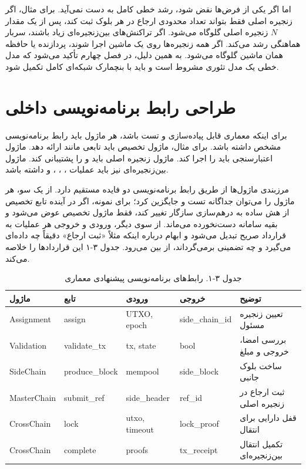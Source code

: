 اما اگر یکی از فرض‌ها نقض شود، رشد خطی کامل به دست نمی‌آید. برای مثال، اگر زنجیره اصلی فقط بتواند تعداد محدودی ارجاع در هر بلوک ثبت کند، پس از یک مقدار \(N\) زنجیره اصلی گلوگاه می‌شود. اگر تراکنش‌های بین‌زنجیره‌ای زیاد باشند، سربار هماهنگی رشد می‌کند. اگر همه زنجیره‌ها روی یک ماشین اجرا شوند، پردازنده یا حافظه همان ماشین گلوگاه می‌شود. به همین دلیل، در فصل چهارم تأکید می‌شود که مدل خطی یک مدل تئوری مشروط است و باید با بنچمارک شبکه‌ای کامل تکمیل شود.

\section{طراحی رابط برنامه‌نویسی داخلی}

برای اینکه معماری قابل پیاده‌سازی و تست باشد، هر ماژول باید رابط برنامه‌نویسی مشخص داشته باشد. برای مثال، ماژول تخصیص باید تابعی مانند  ارائه دهد. ماژول اعتبارسنجی باید  را اجرا کند. ماژول زنجیره اصلی باید  و  را پشتیبانی کند. ماژول بین‌زنجیره‌ای نیز باید عملیات ، ، ،  و  داشته باشد.

مرزبندی ماژول‌ها از طریق رابط برنامه‌نویسی دو فایده مستقیم دارد. از یک سو، هر ماژول را می‌توان جداگانه تست و جایگزین کرد؛ برای نمونه، اگر در آینده تابع تخصیص از هش ساده به درهم‌سازی سازگار تغییر کند، فقط ماژول تخصیص عوض می‌شود و بقیه سامانه دست‌نخورده می‌ماند. از سوی دیگر، ورودی و خروجی هر عملیات به قرارداد صریح تبدیل می‌شود و ابهام درباره اینکه مثلاً «ثبت ارجاع» دقیقاً چه داده‌ای می‌گیرد و چه تضمینی برمی‌گرداند، از بین می‌رود. جدول ۳-۱ این قراردادها را خلاصه می‌کند.

\begin{table}[h]
\centering
\caption{جدول ۳-۱. رابط‌های برنامه‌نویسی پیشنهادی معماری}
\small
\begin{tabular}{|p{2.2cm}|p{2.8cm}|p{2.5cm}|p{2.8cm}|p{2.8cm}|}
\hline
ماژول & تابع & ورودی & خروجی & توضیح \\
\hline
Assignment & assign & UTXO, epoch & side\_chain\_id & تعیین زنجیره مسئول \\
\hline
Validation & validate\_tx & tx, state & bool & بررسی امضا، خروجی و مبلغ \\
\hline
SideChain & produce\_block & mempool & side\_block & ساخت بلوک جانبی \\
\hline
MasterChain & submit\_ref & side\_header & ref\_id & ثبت ارجاع در زنجیره اصلی \\
\hline
CrossChain & lock & utxo, timeout & lock\_proof & قفل دارایی برای انتقال \\
\hline
CrossChain & complete & proofs & tx\_receipt & تکمیل انتقال بین‌زنجیره‌ای \\
\hline
\end{tabular}
\end{table}

